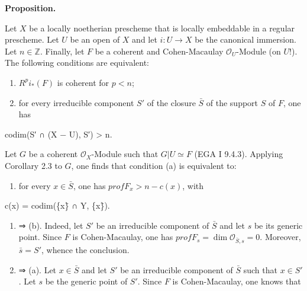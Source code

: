 \documentclass[
]{article}
\newenvironment{Shaded}{}{}
\newcommand{\NormalTok}[1]{#1}
\providecommand{\tightlist}{%
  \setlength{\itemsep}{0pt}\setlength{\parskip}{0pt}}
\begin{document}
\textbf{Proposition.}

Let \(X\) be a locally noetherian prescheme that is locally embeddable
in a regular prescheme. Let \(U\) be an open of \(X\) and let
\(i : U \to X\) be the canonical immersion. Let \(n \in \mathbb{Z}\).
Finally, let \(F\) be a coherent and Cohen-Macaulay
\(\mathcal{O}_{U}\)-Module (on \(U\)!). The following conditions are
equivalent:

\begin{enumerate}
\def\labelenumi{(\alph{enumi})}
\item
  \(R^{p} i_{*}(F)\) is coherent for \(p < n\);
\item
  for every irreducible component \(S'\) of the closure \(\bar{S}\) of
  the support \(S\) of \(F\), one has
\end{enumerate}

\begin{Shaded}
\begin{Highlighting}[]
\NormalTok{codim(S′ ∩ (X − U), S′) \textgreater{} n.}
\end{Highlighting}
\end{Shaded}

Let \(G\) be a coherent \(\mathcal{O}_{X}\)-Module such that
\(G|U \simeq F\) (EGA I 9.4.3). Applying Corollary 2.3 to \(G\), one
finds that condition (a) is equivalent to:

\begin{enumerate}
\def\labelenumi{(\alph{enumi})}
\setcounter{enumi}{2}
\tightlist
\item
  for every \(x \in \bar{S}\), one has \(prof F_{x} > n - c(x)\), with
\end{enumerate}

\begin{Shaded}
\begin{Highlighting}[]
\NormalTok{c(x) = codim(\{x\}̄ ∩ Y, \{x\}̄).}
\end{Highlighting}
\end{Shaded}

\begin{enumerate}
\def\labelenumi{(\alph{enumi})}
\item
  ⇒ (b). Indeed, let \(S'\) be an irreducible component of \(\bar{S}\)
  and let \(s\) be its generic point. Since \(F\) is Cohen-Macaulay, one
  has \(prof F_{s} = \dim \mathcal{O}_{\bar{S}, s} = 0\). Moreover,
  \(\bar{s} = S'\), whence the conclusion.
\item
  ⇒ (a). Let \(x \in \bar{S}\) and let \(S'\) be an irreducible
  component of \(\bar{S}\) such that \(x \in S'\). Let \(s\) be the
  generic point of \(S'\). Since \(F\) is Cohen-Macaulay, one knows that
\end{enumerate}
\end{document}
